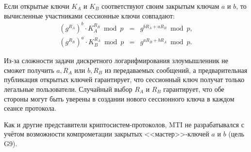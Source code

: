 Если открытые ключи $K_A$ и $K_B$ соответствуют своим закрытым ключам $a$ и $b$, то вычисленные участниками сессионные ключи совпадают:
\[\begin{array}{lll}
    (g^{R_A})^b \cdot K_A^{R_B} \bmod p & = & g^{b R_A + a R_B} \bmod p, \\
    (g^{R_B})^a \cdot K_B^{R_A} \bmod p & = & g^{a R_B + b R_A} \bmod p.
\end{array}\]

Из-за сложности задачи дискретного логарифмирования злоумышленник не сможет получить $a, R_A$ или $b, R_B$ из передаваемых сообщений, а предварительная публикация открытых ключей гарантирует, что сессионный ключ получат только легальные пользователи. Случайный выбор $R_A$ и $R_B$ гарантирует, что обе стороны могут быть уверены в создании нового сессионного ключа в каждом сеансе протокола.

Как и другие представители криптосистем-протоколов, MTI не разрабатывался с учётом возможности компрометации закрытых <<мастер>>-ключей $a$ и $b$ (цель G9).

